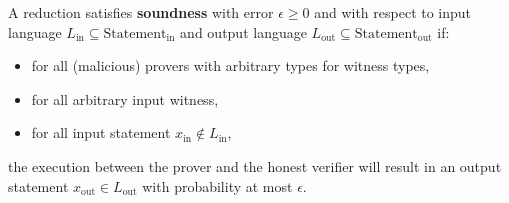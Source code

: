 \begin{definition}[Soundness]
    \label{def:soundness}
    A reduction satisfies \textbf{soundness} with error $\epsilon \geq 0$ and with respect to input
    language $L_{\text{in}} \subseteq \text{Statement}_{\text{in}}$ and output language $L_{\text{out}} \subseteq \text{Statement}_{\text{out}}$ if:
    \begin{itemize}
        \item for all (malicious) provers with arbitrary types for witness types,
        \item for all arbitrary input witness,
        \item for all input statement $x_{\text{in}} \notin L_{\text{in}}$,
    \end{itemize}
    the execution between the prover and the honest verifier will result in an output statement
    $x_{\text{out}} \in L_{\text{out}}$ with probability at most $\epsilon$.
\end{definition}

